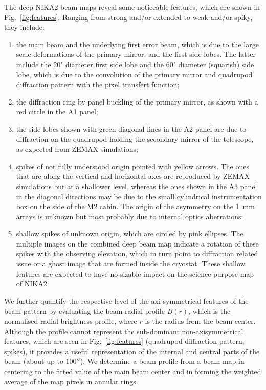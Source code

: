The deep NIKA2 beam maps reveal some noticeable features, which are
shown in Fig.~\ref{fig:features}. Ranging from strong and/or extended to
weak and/or spiky, they include:
\begin{enumerate}
\item the main beam and the underlying first error
  beam, which is due to the large scale deformations of the primary
  mirror, and the first side lobes. The latter include 
  the 20" diameter first side lobe and the 60" diameter (squarish)
  side lobe, which is due to the convolution of the primary mirror and quadrupod
  diffraction pattern with the pixel transfert function;
\item the diffraction ring by panel buckling of the primary
  mirror, as shown with a red circle in the A1 panel;
\item the side lobes shown with green
  diagonal lines in the A2 panel are due to diffraction on the
  quadrupod holding the secondary mirror of the telescope, as expected
  from ZEMAX simulations;  
\item spikes of not fully understood origin pointed with yellow
  arrows. The ones that are along the vertical and
  horizontal axes are reproduced by ZEMAX simulations but at a 
  shallower level, whereas the ones shown in the A3 panel in the
  diagonal directions may be due to the small cylindrical
  instrumentation box on the side of the M2 cabin. The origin of the
  asymmetry on the 1~mm arrays is unknown but most probably due to
  internal optics aberrations;
\item shallow spikes of unknown origin, which are circled by pink
  ellipses. The multiple images on the combined deep beam map indicate
  a rotation of these spikes with the observing elevation, which in
  turn point to diffraction related issue or a ghost image that are
  formed inside the cryostat. These shallow features are expected to
  have no sizable impact on the science-purpose map of NIKA2.
\end{enumerate}

We further quantify the respective level of the axi-symmetrical
features of the beam pattern by evaluating the beam radial profile
$B(r)$, which is the normalised radial brightness profile,
where $r$ is the radius from the beam center.
Although the profile cannot represent the sub-dominant non-axisymmetrical
features, which are seen in Fig.~\ref{fig:features} (quadrupod
diffraction pattern, spikes), it provides a useful
representation of the internal and central parts of the beam (about up to
$100''$). We determine a beam profile from a beam map in centering to
the fitted value of the main beam center and in forming the
weighted average of the map pixels in annular rings.

